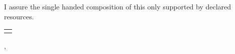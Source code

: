 \thispagestyle{empty}
\vspace*{0.75\textheight}
\noindent
I assure the single handed composition of this \MakeLowercase{\getDoctype{}} only supported by declared resources. \newline \bigskip 
\newline 
\begin{tabular}{c}
\hrulefill \\
\end{tabular}

\medskip \noindent
\getSubmissionLocation{}, \getSubmissionDate{} \hspace{2cm} \getAuthor{}
\cleardoublepage{}